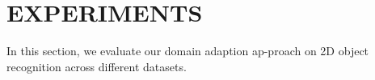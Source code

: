 \documentclass{article}
\begin{document}
%
%
%
%


             


\section{EXPERIMENTS}
\label{sec:3}

In this section, we evaluate our domain adaption ap-proach on 2D object recognition across different datasets.
\end{document}
